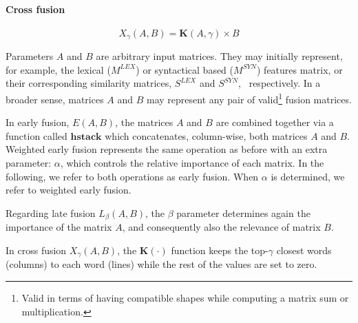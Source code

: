 \documentclass{llncs}
\begin{document}
\paragraph{Cross fusion}
\begin{equation}
X_{\gamma}(A,B) = \mathbf{K}(A,\gamma) \times B
\end{equation}


Parameters $A$ and $B$ are arbitrary input matrices. They may initially represent, for example,  the lexical ($M^{LEX}$) or syntactical based ($M^{SYN}$) features matrix, or their  corresponding similarity matrices, $S^{LEX}$ and  $S^{SYN}$, ~respectively. In a broader sense, matrices $A$ and $B$ may represent any pair of valid\footnote{Valid in terms of having compatible shapes while computing a matrix sum or multiplication.} fusion matrices. 

In early fusion, $E(A,B)$, the matrices $A$ and $B$ are combined together via a  function called $\mathbf{hstack}$ which concatenates, column-wise, both matrices $A$ and  $B$. Weighted early fusion  represents the same operation as before with an extra parameter: $\alpha$, which controls the relative importance of each matrix. In the following, we refer to both operations as early fusion. When $\alpha$ is determined, we refer to weighted early fusion.

Regarding late fusion $L_\beta(A,B)$, the  $\beta$ parameter determines again the importance of the  matrix $A$,  and consequently also the relevance of matrix $B$.

In cross fusion $X_\gamma(A,B)$, the $\mathbf{K}(\cdot)$ function keeps the top-$\gamma$ closest words (columns) to each word (lines) while the rest of the values are set to zero. 
\end{document}
